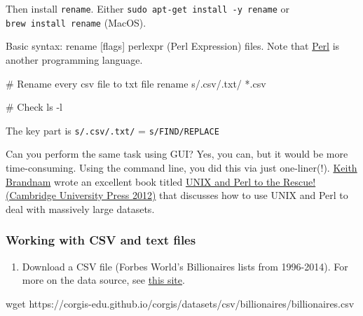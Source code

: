 \documentclass[
  letterpaper,
  DIV=11,
  numbers=noendperiod]{scrreprt}
\newenvironment{Shaded}{\begin{snugshade}}{\end{snugshade}}
\newcommand{\AttributeTok}[1]{\textcolor[rgb]{0.40,0.45,0.13}{#1}}
\newcommand{\CommentTok}[1]{\textcolor[rgb]{0.37,0.37,0.37}{#1}}
\newcommand{\ExtensionTok}[1]{\textcolor[rgb]{0.00,0.23,0.31}{#1}}
\newcommand{\FunctionTok}[1]{\textcolor[rgb]{0.28,0.35,0.67}{#1}}
\newcommand{\NormalTok}[1]{\textcolor[rgb]{0.00,0.23,0.31}{#1}}
\newcommand{\PreprocessorTok}[1]{\textcolor[rgb]{0.68,0.00,0.00}{#1}}
\newcommand{\StringTok}[1]{\textcolor[rgb]{0.13,0.47,0.30}{#1}}
\providecommand{\tightlist}{%
  \setlength{\itemsep}{0pt}\setlength{\parskip}{0pt}}\usepackage{longtable,booktabs,array}
\begin{document}
Then install \texttt{rename}. Either
\texttt{sudo\ apt-get\ install\ -y\ rename} or
\texttt{brew\ install\ rename} (MacOS).

Basic syntax: rename {[}flags{]} perlexpr (Perl Expression) files. Note
that \href{https://en.wikipedia.org/wiki/Perl}{Perl} is another
programming language.

\begin{Shaded}
\begin{Highlighting}[]
\CommentTok{\# Rename every csv file to txt file }
\ExtensionTok{rename} \StringTok{\textquotesingle{}s/.csv/.txt/\textquotesingle{}} \PreprocessorTok{*}\NormalTok{.csv}

\CommentTok{\# Check }
\FunctionTok{ls} \AttributeTok{{-}l}
\end{Highlighting}
\end{Shaded}

The key part is \texttt{s/.csv/.txt/} = \texttt{s/FIND/REPLACE}

Can you perform the same task using GUI? Yes, you can, but it would be
more time-consuming. Using the command line, you did this via just
one-liner(!).
\href{http://korflab.ucdavis.edu/Bios/bio_keithb.html}{Keith Brandnam}
wrote an excellent book titled
\href{https://www.amazon.com/Unix-Perl-Rescue-Keith-Bradnam/dp/0521169828}{UNIX
and Perl to the Rescue! (Cambridge University Press 2012)} that
discusses how to use UNIX and Perl to deal with massively large
datasets.

\hypertarget{working-with-csv-and-text-files}{%
\subsubsection*{Working with CSV and text
files}\label{working-with-csv-and-text-files}}

\begin{enumerate}
\def\labelenumi{\arabic{enumi}.}
\tightlist
\item
  Download a CSV file (Forbes World's Billionaires lists from
  1996-2014). For more on the data source, see
  \href{https://corgis-edu.github.io/corgis/csv/billionaires/}{this
  site}.
\end{enumerate}

\begin{Shaded}
\begin{Highlighting}[]
\FunctionTok{wget}\NormalTok{ https://corgis{-}edu.github.io/corgis/datasets/csv/billionaires/billionaires.csv}
\end{Highlighting}
\end{Shaded}
\end{document}
